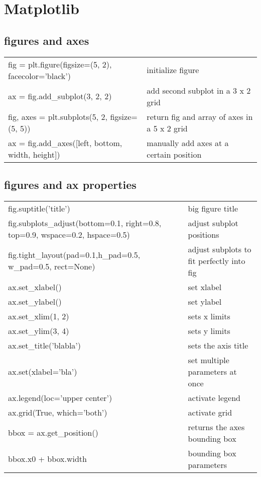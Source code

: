 \documentclass[10pt, a4paper, twocolumn]{article}
\begin{document}
\newpage
\section*{Matplotlib}
\subsection*{figures and axes}
\begin{tabular}{ p{} p{} }
    fig = plt.figure(figsize=(5, 2), facecolor='black') & initialize figure\\
                         ax = fig.add\_subplot(3, 2, 2) & add second subplot in a 3 x 2 grid\\
         fig, axes = plt.subplots(5, 2, figsize=(5, 5)) & return fig and array of axes in a 5 x 2 grid\\
             ax = fig.add\_axes([left, bottom, width, height]) & manually add axes at a certain position\\
\end{tabular}

\subsection*{figures and ax properties}
\begin{tabular}{ p{} p{} }
    fig.suptitle('title') & big figure title\\
    fig.subplots\_adjust(bottom=0.1, right=0.8, top=0.9, wspace=0.2, hspace=0.5) & adjust subplot positions\\
                   fig.tight\_layout(pad=0.1,h\_pad=0.5, w\_pad=0.5, rect=None) & adjust subplots to fit perfectly into fig\\
ax.set\_xlabel() & set xlabel\\
ax.set\_ylabel() & set ylabel\\
ax.set\_xlim(1, 2) & sets x limits\\
ax.set\_ylim(3, 4) & sets y limits\\
ax.set\_title('blabla') & sets the axis title\\
ax.set(xlabel='bla') & set multiple parameters at once\\ 
         ax.legend(loc='upper center') & activate legend\\
           ax.grid(True, which='both') & activate grid\\
             bbox = ax.get\_position() & returns the axes bounding box\\
                  bbox.x0 + bbox.width & bounding box parameters\\
\end{tabular}
\end{document}
